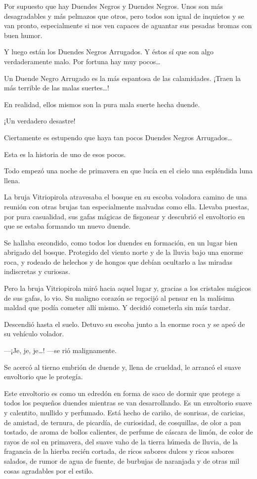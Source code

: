 \documentclass{barcodevapor3pags}
\begin{document}
Por supuesto que hay Duendes Negros y Duendes Negros. Unos son más
desagradables y más pelmazos que otros, pero todos son igual de
inquietos y se van pronto, especialmente si nos ven capaces de aguantar
sus pesadas bromas con buen humor.

Y luego están los Duendes Negros Arrugados. Y éstos sí que son algo
verdaderamente malo. Por fortuna hay muy pocos\ldots{}

Un Duende Negro Arrugado es la más espantosa de las calamidades. ¡Traen
la más terrible de las malas suertes\ldots!

En realidad, ellos mismos son la pura mala suerte hecha duende.

¡Un verdadero desastre!

Ciertamente es estupendo que haya tan pocos Duendes Negros
Arrugados\ldots{}

Esta es la historia de uno de esos pocos.

Todo empezó una noche de primavera en que lucía en el cielo una
espléndida luna llena.

La bruja Vitriopirola atravesaba el bosque en su escoba voladora camino
de una reunión con otras brujas tan especialmente malvadas como ella.
Llevaba puestas, por pura casualidad, sus gafas mágicas de fisgonear y
descubrió el envoltorio en que se estaba formando un nuevo duende.

Se hallaba escondido, como todos los duendes en formación, en un lugar
bien abrigado del bosque. Protegido del viento norte y de la lluvia bajo
una enorme roca, y rodeado de helechos y de hongos que debían ocultarlo
a las miradas indiscretas y curiosas.

Pero la bruja Vitriopirola miró hacia aquel lugar y, gracias a los
cristales mágicos de sus gafas, lo vio. Su maligno corazón se regocijó
al pensar en la malísima maldad que podía cometer allí mismo. Y decidió
cometerla sin más tardar.

Descendió hasta el suelo. Detuvo su escoba junto a la enorme roca y se
apeó de su vehículo volador.

---¡Je, je, je\ldots! ---se rió malignamente.

Se acercó al tierno embrión de duende y, llena de crueldad, le arrancó
el suave envoltorio que le protegía.

Este envoltorio es como un edredón en forma de saco de dormir que
protege a todos los pequeños duendes mientras se van desarrollando. Es
un envoltorio suave y calentito, mullido y perfumado. Está hecho de
cariño, de sonrisas, de caricias, de amistad, de ternura, de picardía,
de curiosidad, de cosquillas, de olor a pan tostado, de aroma de bollos
calientes, de perfume de cáscara de limón, de color de rayos de sol en
primavera, del suave vaho de la tierra húmeda de lluvia, de la fragancia
de la hierba recién cortada, de ricos sabores dulces y ricos sabores
salados, de rumor de agua de fuente, de burbujas de naranjada y de otras
mil cosas agradables por el estilo.
\end{document}

